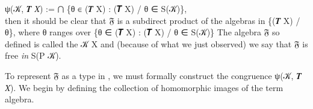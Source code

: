 \documentclass[a4paper,UKenglish,cleveref,autoref,thm-restate]{lipics-v2021}
\begin{document}
\af ψ(\ab 𝒦, \af 𝑻 \ab 𝑋) := \af ⋂ \{\ab θ \af ∈  (\af 𝑻 \ab X) \as : (\af 𝑻 \ab X) \af / \ab θ \af ∈ \ad S(\ab 𝒦)\},\\
then it should be clear that \af 𝔉 is a subdirect product of the algebras in \{(\af 𝑻 \ab X) \af / \ab θ\}, where \ab θ ranges over \{\ab θ \af ∈  (\af 𝑻 \ab X) \as : (\af 𝑻 \ab X) \af / \ab θ \af ∈ \ad S(\ab 𝒦)\}
The algebra \af 𝔉 so defined is called the  \ab 𝒦  \ab X and (because of what we just observed) we say that \af 𝔉 is free \emph{in} \ad S(\ad P \ab 𝒦).

To represent \af 𝔉 as a type in \agda, we must formally construct the congruence \af ψ(\ab 𝒦, \af 𝑻 \ab 𝑋).
We begin by defining the collection  of homomorphic images of the term algebra.
\ccpad
\begin{code}%
\>[0]\<%
\>[1]\AgdaSpace{}%
\AgdaSymbol{:}\AgdaSpace{}%
\AgdaSpace{}%
\AgdaSymbol{(}\AgdaSpace{}%
\AgdaSpace{}%
\AgdaSymbol{)}\AgdaSpace{}%
\AgdaSpace{}%
\AgdaSpace{}%
\AgdaSpace{}%
\AgdaSpace{}%
\AgdaSpace{}%
\AgdaSpace{}%
\<%
\\
%
\>[1]\AgdaSpace{}%
\AgdaSpace{}%
\AgdaSymbol{=}\AgdaSpace{}%
\AgdaSpace{}%
\AgdaSpace{}%
\AgdaSpace{}%
\AgdaSymbol{(}\AgdaSpace{}%
\AgdaSpace{}%
\AgdaSymbol{)}\AgdaSpace{}%
\AgdaFunction{,}\AgdaSpace{}%
\AgdaSpace{}%
\AgdaSpace{}%
\AgdaSpace{}%
\AgdaSpace{}%
\AgdaSymbol{(}\AgdaSpace{}%
\AgdaSymbol{)}\AgdaSpace{}%
\AgdaSpace{}%
\AgdaFunction{,}\AgdaSpace{}%
\AgdaSymbol{(}\AgdaSpace{}%
\AgdaSpace{}%
\AgdaSymbol{)}\AgdaSpace{}%
\AgdaSpace{}%
\AgdaSpace{}%
\AgdaSpace{}%
\AgdaSpace{}%
\<%
\end{code}
\end{document}
